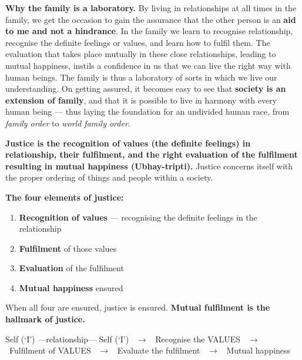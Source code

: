 \textbf{Why the family is a laboratory.} By living in relationships at all
times in the family, we get the occasion to gain the assurance that the other
person is an \textbf{aid to me and not a hindrance}. In the family we learn to
recognise relationship, recognise the definite feelings or values, and learn
how to fulfil them. The evaluation that takes place mutually in these close
relationships, leading to mutual happiness, instils a confidence in us that we
can live the right way with human beings. The family is thus a laboratory of
sorts in which we live our understanding. On getting assured, it becomes easy
to see that \textbf{society is an extension of family}, and that it is
possible to live in harmony with every human being --- thus laying the
foundation for an undivided human race, from \emph{family order} to
\emph{world family order}.


\ans \textbf{Justice is the recognition of values (the definite feelings) in
relationship, their fulfilment, and the right evaluation of the fulfilment
resulting in mutual happiness (Ubhay-tripti).} Justice concerns itself with
the proper ordering of things and people within a society.

\begin{keybox}
\textbf{The four elements of justice:}
\begin{enumerate}[label=\textbf{\color{ocre}\arabic*.},leftmargin=2.0em,
  itemsep=1pt,topsep=3pt,parsep=0pt]
\item \textbf{Recognition of values} --- recognising the definite feelings in
      the relationship
\item \textbf{Fulfilment} of those values
\item \textbf{Evaluation} of the fulfilment
\item \textbf{Mutual happiness} ensured
\end{enumerate}
\vspace{3pt}
When all four are ensured, justice is ensured. \textbf{Mutual fulfilment is
the hallmark of justice.}
\end{keybox}

\begin{center}\small\sffamily\color{slate}
Self (`I') ---relationship--- Self (`I') \ $\rightarrow$ \ Recognise the
VALUES \ $\rightarrow$ \ Fulfilment of VALUES \ $\rightarrow$ \ Evaluate the
fulfilment \ $\rightarrow$ \ Mutual happiness
\end{center}

